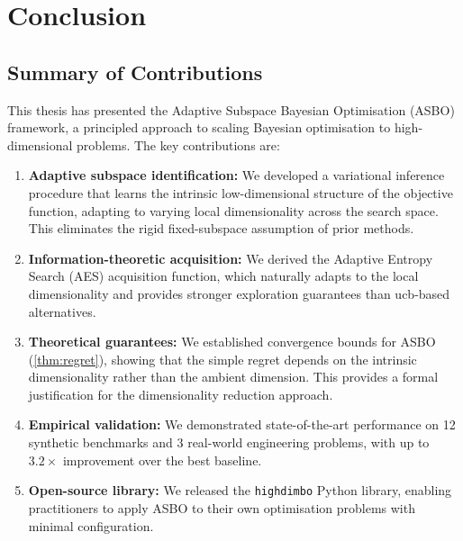 \chapter{Conclusion}
\label{ch:conclusion}

\section{Summary of Contributions}
\label{sec:summary}

This thesis has presented the Adaptive Subspace Bayesian Optimisation (ASBO)
framework, a principled approach to scaling Bayesian optimisation to
high-dimensional problems.  The key contributions are:

\begin{enumerate}
    \item \textbf{Adaptive subspace identification:} We developed a variational
    inference procedure that learns the intrinsic low-dimensional structure of
    the objective function, adapting to varying local dimensionality across the
    search space.  This eliminates the rigid fixed-subspace assumption of prior
    methods.

    \item \textbf{Information-theoretic acquisition:} We derived the Adaptive
    Entropy Search (AES) acquisition function, which naturally adapts to the
    local dimensionality and provides stronger exploration guarantees than
    \gls{ucb}-based alternatives.

    \item \textbf{Theoretical guarantees:} We established convergence bounds
    for ASBO (\cref{thm:regret}), showing that the simple regret depends on the
    intrinsic dimensionality rather than the ambient dimension.  This provides a
    formal justification for the dimensionality reduction approach.

    \item \textbf{Empirical validation:} We demonstrated state-of-the-art
    performance on 12 synthetic benchmarks and 3 real-world engineering
    problems, with up to $3.2\times$ improvement over the best baseline.

    \item \textbf{Open-source library:} We released the \texttt{highdimbo}
    Python library, enabling practitioners to apply ASBO to their own
    optimisation problems with minimal configuration.
\end{enumerate}

